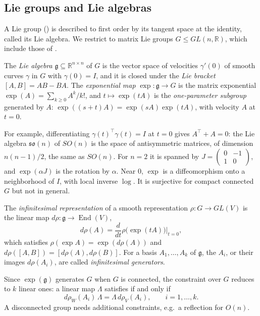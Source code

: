\documentclass[mathematics,review,submit,moreauthors]{Definitions/mdpi}
\begin{document}
\subsection{Lie groups and Lie algebras}\label{sec:lie-algebra}

A Lie group () is described to first order by its tangent space at the identity, called its Lie algebra.
We restrict to matrix Lie groups $G\le GL(n,\mathbb{R})$, which include those of .

\begin{Definition}\label{def:lie-algebra}
    The \emph{Lie algebra} $\mathfrak{g}\subseteq\mathbb{R}^{n\times n}$ of $G$ is the vector space of velocities $\gamma'(0)$ of smooth curves $\gamma$ in $G$ with $\gamma(0)=I$, and it is closed under the \emph{Lie bracket} $[A,B]=AB-BA$.
    The \emph{exponential map} $\exp:\mathfrak{g}\to G$ is the matrix exponential $\exp(A)=\sum_{k\ge0}A^k/k!$, and $t\mapsto\exp(tA)$ is the \emph{one-parameter subgroup} generated by $A$: $\exp((s+t)A)=\exp(sA)\exp(tA)$, with velocity $A$ at $t=0$.
\end{Definition}

For example, differentiating $\gamma(t)^\top\gamma(t)=I$ at $t=0$ gives $A^\top+A=0$: the Lie algebra $\mathfrak{so}(n)$ of $SO(n)$ is the space of antisymmetric matrices, of dimension $n(n-1)/2$, the same as $SO(n)$.
For $n=2$ it is spanned by $J=\left(\begin{smallmatrix}0&-1\\1&0\end{smallmatrix}\right)$, and $\exp(\alpha J)$ is the rotation by $\alpha$.
Near $0$, $\exp$ is a diffeomorphism onto a neighborhood of $I$, with local inverse $\log$.
It is surjective for compact connected $G$ but not in general.

\begin{Definition}\label{def:infinitesimal-generators}
    The \emph{infinitesimal representation} of a smooth representation $\rho:G\to GL(V)$ is the linear map $d\rho:\mathfrak{g}\to\operatorname{End}(V)$,
    \[
        d\rho(A)=\frac{d}{dt}\rho\big(\exp(tA)\big)\Big\vert_{t=0},
    \]
    which satisfies $\rho(\exp A)=\exp(d\rho(A))$ and $d\rho([A,B])=[d\rho(A),d\rho(B)]$.
    For a basis $A_1,\dots,A_k$ of $\mathfrak{g}$, the $A_i$, or their images $d\rho(A_i)$, are called \emph{infinitesimal generators}.
\end{Definition}

Since $\exp(\mathfrak{g})$ generates $G$ when $G$ is connected, the constraint over $G$ reduces to $k$ linear ones: a linear map $\Lambda$ satisfies  if and only if
\begin{equation}\label{eq:lie-algebra-equivariance}
    d\rho_W(A_i)\,\Lambda=\Lambda\,d\rho_V(A_i),\qquad i=1,\dots,k.
\end{equation}
A disconnected group needs additional constraints, e.g.\ a reflection for $O(n)$.
\end{document}
